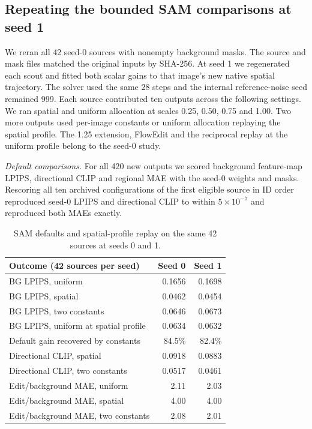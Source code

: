 \subsection{Repeating the bounded SAM comparisons at seed 1}\label{sec:sam-seed-repeat}
We reran all 42 seed-0 sources with nonempty background masks. The source and mask files matched the original inputs by SHA-256. At seed 1 we regenerated each scout and fitted both scalar gains to that image's new native spatial trajectory. The solver used the same 28 steps and the internal reference-noise seed remained 999. Each source contributed ten outputs across the following settings. We ran spatial and uniform allocation at scales 0.25, 0.50, 0.75 and 1.00. Two more outputs used per-image constants or uniform allocation replaying the spatial profile. The 1.25 extension, FlowEdit and the reciprocal replay at the uniform profile belong to the seed-0 study.

\noindent\textit{Default comparisons.} For all 420 new outputs we scored background feature-map LPIPS, directional CLIP and regional MAE with the seed-0 weights and masks. Rescoring all ten archived configurations of the first eligible source in ID order reproduced seed-0 LPIPS and directional CLIP to within $5\times10^{-7}$ and reproduced both MAEs exactly.

\begin{table}[!ht]
\centering\small
\caption{SAM defaults and spatial-profile replay on the same 42 sources at seeds 0 and 1.}
\label{tab:sam-repeat-default}
\begin{tabular}{@{}lrr@{}}
\toprule
Outcome (42 sources per seed) & Seed 0 & Seed 1\\
\midrule
BG LPIPS, uniform                & 0.1656 & 0.1698\\
BG LPIPS, spatial                & 0.0462 & 0.0454\\
BG LPIPS, two constants          & 0.0646 & 0.0673\\
BG LPIPS, uniform at spatial profile & 0.0634 & 0.0632\\
Default gain recovered by constants & 84.5\% & 82.4\%\\
Directional CLIP, spatial        & 0.0918 & 0.0883\\
Directional CLIP, two constants  & 0.0517 & 0.0461\\
Edit/background MAE, uniform     & 2.11 & 2.03\\
Edit/background MAE, spatial     & 4.00 & 4.00\\
Edit/background MAE, two constants & 2.08 & 2.01\\
\bottomrule
\end{tabular}
\end{table}

